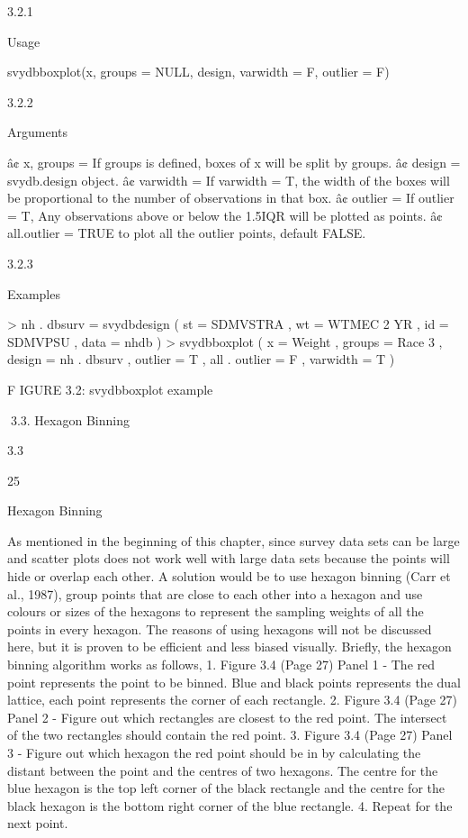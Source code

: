 3.2.1

Usage

svydbboxplot(x, groups = NULL, design, varwidth = F, outlier = F)

3.2.2

Arguments

â¢ x, groups = If groups is defined, boxes of x will be split by groups.
â¢ design = svydb.design object.
â¢ varwidth = If varwidth = T, the width of the boxes will be proportional to the
number of observations in that box.
â¢ outlier = If outlier = T, Any observations above or below the 1.5IQR will be
plotted as points.
â¢ all.outlier = TRUE to plot all the outlier points, default FALSE.

3.2.3

Examples

> nh . dbsurv = svydbdesign ( st = SDMVSTRA , wt = WTMEC 2 YR ,
id = SDMVPSU , data = nhdb )
> svydbboxplot ( x = Weight , groups = Race 3 ,
design = nh . dbsurv , outlier = T ,
all . outlier = F , varwidth = T )

F IGURE 3.2: svydbboxplot example

3.3. Hexagon Binning

3.3

25

Hexagon Binning

As mentioned in the beginning of this chapter, since survey data sets can be large
and scatter plots does not work well with large data sets because the points will
hide or overlap each other. A solution would be to use hexagon binning (Carr et al.,
1987), group points that are close to each other into a hexagon and use colours or
sizes of the hexagons to represent the sampling weights of all the points in every
hexagon. The reasons of using hexagons will not be discussed here, but it is proven
to be efficient and less biased visually.
Briefly, the hexagon binning algorithm works as follows,
1. Figure 3.4 (Page 27) Panel 1 - The red point represents the point to be binned.
Blue and black points represents the dual lattice, each point represents the corner of each rectangle.
2. Figure 3.4 (Page 27) Panel 2 - Figure out which rectangles are closest to the red
point. The intersect of the two rectangles should contain the red point.
3. Figure 3.4 (Page 27) Panel 3 - Figure out which hexagon the red point should be
in by calculating the distant between the point and the centres of two hexagons.
The centre for the blue hexagon is the top left corner of the black rectangle and
the centre for the black hexagon is the bottom right corner of the blue rectangle.
4. Repeat for the next point.

